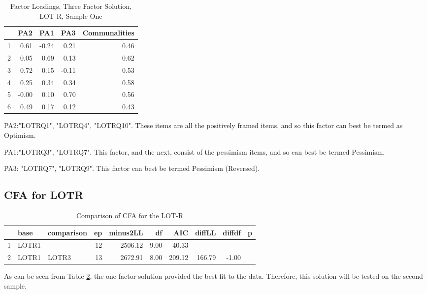\documentclass{article}
\begin{document}
\begin{table}[ht]
\centering
\begin{tabular}{rrrrr}
  \hline
 & PA2 & PA1 & PA3 & Communalities \\ 
  \hline
1 & 0.61 & -0.24 & 0.21 & 0.46 \\ 
  2 & 0.05 & 0.69 & 0.13 & 0.62 \\ 
  3 & 0.72 & 0.15 & -0.11 & 0.53 \\ 
  4 & 0.25 & 0.34 & 0.34 & 0.58 \\ 
  5 & -0.00 & 0.10 & 0.70 & 0.56 \\ 
  6 & 0.49 & 0.17 & 0.12 & 0.43 \\ 
   \hline
\end{tabular}
\caption{Factor Loadings, Three Factor Solution, LOT-R, Sample One} 
\label{tab:tcq1lotr3fact}
\end{table}
PA2:"LOTRQ1",  "LOTRQ4",  "LOTRQ10". These items are all the positively framed items, and so this factor can best be termed as Optimism. 

PA1:"LOTRQ3", "LOTRQ7". This factor, and the next, consist of the pessimism items, and so can best be termed Pessimism. 

PA3: "LOTRQ7", "LOTRQ9". This factor can best be termed Pessimism (Reversed). 





\subsection{CFA for LOTR}
\label{sec:cfa-lotr}




\begin{table}[ht]
\centering
\begin{tabular}{rllrrrrrrr}
  \hline
 & base & comparison & ep & minus2LL & df & AIC & diffLL & diffdf & p \\ 
  \hline
1 & LOTR1 &  &  12 & 2506.12 & 9.00 & 40.33 &  &  &  \\ 
  2 & LOTR1 & LOTR3 &  13 & 2672.91 & 8.00 & 209.12 & 166.79 & -1.00 &  \\ 
   \hline
\end{tabular}
\caption{Comparison of CFA for the LOT-R} 
\label{tab:semlotrcomp}
\end{table}
As can be seen from Table \ref{tab:semlotrcomp}, the one factor solution provided the best fit to the data.  Therefore, this solution will be tested on the second sample.
\end{document}
